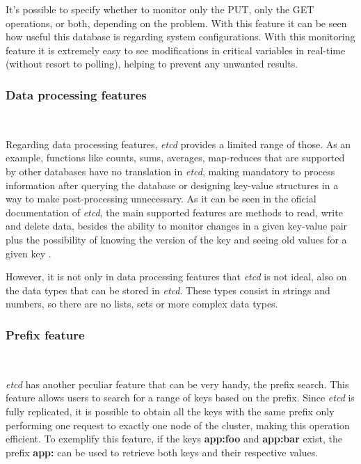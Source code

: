 \documentclass[screen,review]{acmart}
\begin{document}
It's possible to specify whether to monitor only the PUT, only the GET operations, or both, depending on the problem.
With this feature it can be seen how useful this database is regarding system configurations. With this monitoring feature it is extremely easy to see modifications in critical variables in real-time (without resort to polling), helping to prevent any unwanted results. \\

\subsubsection{Data processing features}~\

Regarding data processing features, \textit{etcd} provides a limited range of those. As an example, functions like counts, sums, averages, map-reduces that are supported by other databases have no translation in \textit{etcd}, making mandatory to process information after querying the database or designing key-value structures in a way to make post-processing unnecessary.
As it can be seen in the oficial documentation of \textit{etcd}, the main supported features are methods to read, write and delete data, besides the ability to monitor changes in a given key-value pair plus the possibility of knowing the version of the key and seeing old values for a given key \cite{etcd_interacting} \cite{etcd_api}.

However, it is not only in data processing features that \textit{etcd} is not ideal, also on the data types that can be stored in \textit{etcd}. These types consist in strings and numbers, so there are no lists, sets or more complex data types. \\

\subsubsection{Prefix feature}~\

\textit{etcd} has another peculiar feature that can be very handy, the prefix search. This feature allows users to search for a range of keys based on the prefix. Since \textit{etcd} is fully replicated, it is possible to obtain all the keys with the same prefix only performing one request to exactly one node of the cluster, making this operation efficient.
To exemplify this feature, if the keys \textbf{app:foo} and \textbf{app:bar} exist, the prefix \textbf{app:} can be used to retrieve both keys and their respective values.
\end{document}
